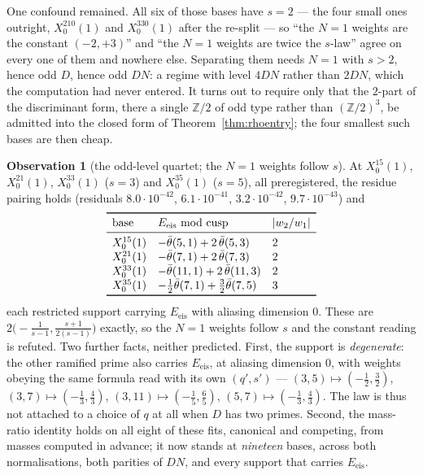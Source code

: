 \documentclass[11pt,reqno]{amsart}
\theoremstyle{plain}
\theoremstyle{definition}
\newtheorem{observation}[theorem]{Observation}
\newcommand{\Z}{\mathbb{Z}}
\begin{document}
One confound remained. All six of those bases have $s=2$ --- the four small ones outright,
$X_0^{210}(1)$ and $X_0^{330}(1)$ after the re-split --- so ``the $N=1$ weights are the
constant $(-2,+3)$'' and ``the $N=1$ weights are twice the $s$-law'' agree on every one of
them and nowhere else. Separating them needs $N=1$ with $s>2$, hence odd $D$, hence odd
$DN$: a regime with level $4DN$ rather than $2DN$, which the computation had never entered.
It turns out to require only that the $2$-part of the discriminant form, there a single
$\mathbb{Z}/2$ of odd type rather than $(\Z/2)^3$, be admitted into the closed form of
Theorem~\ref{thm:rhoentry}; the four smallest such bases are then cheap.

\begin{observation}[the odd-level quartet; the $N=1$ weights follow $s$]\label{obs:oddlev}
At $X_0^{15}(1)$, $X_0^{21}(1)$, $X_0^{33}(1)$ ($s=3$) and $X_0^{35}(1)$ ($s=5$), all
preregistered, the residue pairing holds (residuals $8.0\cdot10^{-42}$, $6.1\cdot10^{-41}$,
$3.2\cdot10^{-42}$, $9.7\cdot10^{-43}$) and
\[
\begin{array}{lll}
\toprule
\text{base} & E_{\mathrm{eis}}\ \text{mod cusp} & \lvert w_2/w_1\rvert\\
\midrule
X_0^{15}(1) & -\bar\theta(5,1)+2\,\bar\theta(5,3) & 2\\
X_0^{21}(1) & -\bar\theta(7,1)+2\,\bar\theta(7,3) & 2\\
X_0^{33}(1) & -\bar\theta(11,1)+2\,\bar\theta(11,3) & 2\\
X_0^{35}(1) & -\tfrac12\bar\theta(7,1)+\tfrac32\bar\theta(7,5) & 3\\
\bottomrule
\end{array}
\]
each restricted support carrying $E_{\mathrm{eis}}$ with aliasing dimension $0$. These are
$2\bigl(-\tfrac1{s-1},\tfrac{s+1}{2(s-1)}\bigr)$ exactly, so the $N=1$ weights follow $s$
and the constant reading is refuted. Two further facts, neither predicted. First, the
support is \emph{degenerate}: the other ramified prime also carries $E_{\mathrm{eis}}$, at
aliasing dimension $0$, with weights obeying the same formula read with its own
$(q',s')$ --- $(3,5)\mapsto(-\tfrac12,\tfrac32)$, $(3,7)\mapsto(-\tfrac13,\tfrac43)$,
$(3,11)\mapsto(-\tfrac15,\tfrac65)$, $(5,7)\mapsto(-\tfrac13,\tfrac43)$. The law is thus
not attached to a choice of $q$ at all when $D$ has two primes. Second, the mass-ratio
identity holds on all eight of these fits, canonical and competing, from masses computed
in advance; it now stands at \emph{nineteen} bases, across both normalisations, both
parities of $DN$, and every support that carries $E_{\mathrm{eis}}$.
\end{observation}
\end{document}
